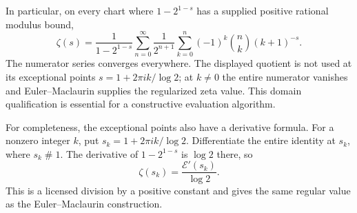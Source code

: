 In particular, on every chart where $1-2^{1-s}$ has a supplied
positive rational modulus bound,
\[
 \boxed{\displaystyle
 \zeta(s)=\frac1{1-2^{1-s}}
 \sum_{n=0}^{\infty}\frac1{2^{n+1}}
       \sum_{k=0}^n(-1)^k\binom nk(k+1)^{-s}.}
\]
The numerator series converges everywhere.  The displayed quotient
is not used at its exceptional points
$s=1+2\pi i k/\log2$; at $k\ne0$ the entire numerator vanishes
and Euler--Maclaurin supplies the regularized zeta value.  This domain
qualification is essential for a constructive evaluation algorithm.

For completeness, the exceptional points also have a derivative formula.
For a nonzero integer $k$, put $s_k=1+2\pi i k/\log2$.
Differentiate the entire identity at $s_k$, where $s_k\mathrel\#1$.
The derivative of $1-2^{1-s}$ is $\log2$ there, so
\[
 \zeta(s_k)=\frac{\mathcal{E}'(s_k)}{\log2}.
\]
This is a licensed division by a positive constant and gives the same
regular value as the Euler--Maclaurin construction.
